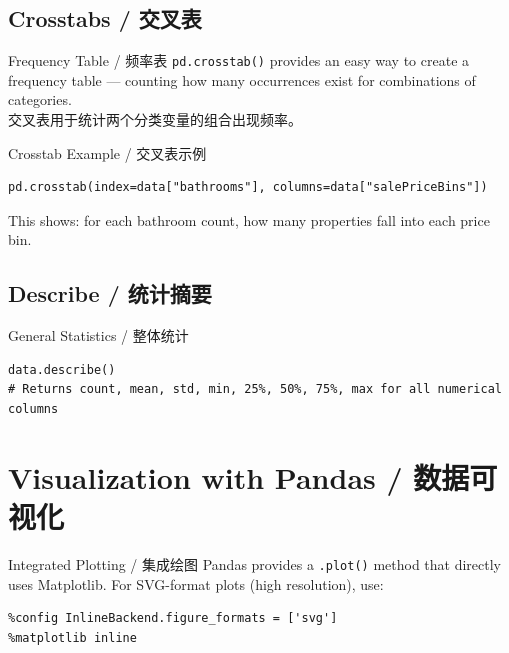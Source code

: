 \documentclass[11pt,a4paper]{report}
\let\oldtexttt\texttt
\renewcommand{\texttt}[1]{\textcolor{mainblue}{\oldtexttt{#1}}}
\begin{document}
\subsection{Crosstabs / 交叉表}

\begin{concept}{Frequency Table / 频率表}
    \texttt{pd.crosstab()} provides an easy way to create a frequency table — counting how many occurrences exist for combinations of categories. \\
    交叉表用于统计两个分类变量的组合出现频率。
\end{concept}

\begin{examplebox}{Crosstab Example / 交叉表示例}
\begin{lstlisting}
pd.crosstab(index=data["bathrooms"], columns=data["salePriceBins"])
\end{lstlisting}
    This shows: for each bathroom count, how many properties fall into each price bin.
\end{examplebox}

\subsection{Describe / 统计摘要}

\begin{examplebox}{General Statistics / 整体统计}
\begin{lstlisting}
data.describe()
# Returns count, mean, std, min, 25%, 50%, 75%, max for all numerical columns
\end{lstlisting}
\end{examplebox}

\section{Visualization with Pandas / 数据可视化}

\begin{concept}{Integrated Plotting / 集成绘图}
    Pandas provides a \texttt{.plot()} method that directly uses Matplotlib. For SVG-format plots (high resolution), use:
\begin{lstlisting}
%config InlineBackend.figure_formats = ['svg']
%matplotlib inline
\end{lstlisting}
\end{concept}
\end{document}
